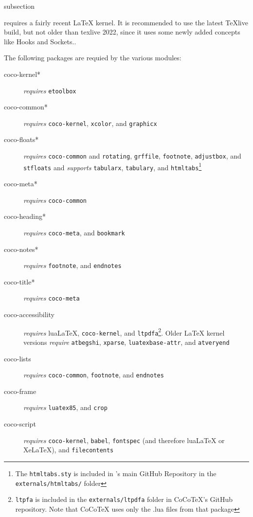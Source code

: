 \begin{Heading}{subsection}
\end{Heading}

{\CoCoTeX} requires a fairly recent LaTeX kernel. It is recommended to
use the latest TeXlive build, but not older than texlive 2022, since
it uses some newly added concepts like Hooks and Sockets..

The following packages are requied by the various {\CoCoTeX} modules:
\begin{description}
\item[\ttfamily coco-kernel*] \textit{requires} \texttt{etoolbox}
\item[\ttfamily coco-common*] \textit{requires} \texttt{coco-kernel},
  \texttt{xcolor}, and \texttt{graphicx}
\item[\ttfamily coco-floats*] \textit{requires} \texttt{coco-common}
  and \texttt{rotating}, \texttt{grffile}, \texttt{footnote},
  \texttt{adjustbox}, and \texttt{stfloats} and \textit{supports}
  \texttt{tabularx}, \texttt{tabulary}, and
  \texttt{htmltabs}\footnote{The \texttt{htmltabs.sty} is included in
    \CoCoTeX's main GitHub Repository in the
    \texttt{externals/htmltabs/} folder}
\item[\ttfamily coco-meta*] \textit{requires} \texttt{coco-common}
\item[\ttfamily coco-heading*] \textit{requires} \texttt{coco-meta}, and
  \texttt{bookmark}
\item[\ttfamily coco-notes*] \textit{requires} \texttt{footnote}, and \texttt{endnotes}
\item[\ttfamily coco-title*] \textit{requires} \texttt{coco-meta}
\item[\ttfamily coco-accessibility] \textit{requires} lua\LaTeX, \texttt{coco-kernel},
  and \texttt{ltpdfa}\footnote{\texttt{ltpfa} is included in the
    \texttt{externals/ltpdfa} folder in CoCoTeX's GitHub
    repository. Note that CoCoTeX uses only the .lua files from that
    package}. Older {\LaTeX} kernel versions \textit{require}
  \texttt{atbegshi}, \texttt{xparse}, \texttt{luatexbase-attr}, and
  \texttt{atveryend}
\item[\ttfamily coco-lists] \textit{requires} \texttt{coco-common}, \texttt{footnote},
  and \texttt{endnotes}
\item[\ttfamily coco-frame] \textit{requires} \texttt{luatex85}, and \texttt{crop}
\item[\ttfamily coco-script] \textit{requires} \texttt{coco-kernel}, \texttt{babel},
  \texttt{fontspec} (and therefore {lua\LaTeX} or Xe\LaTeX), and
  \texttt{filecontents}
\end{description}


